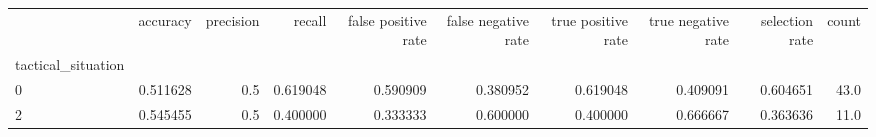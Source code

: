 \begin{tabular}{lrrrrrrrrr}
\toprule
{} &  accuracy &  precision &    recall &  false positive rate &  false negative rate &  true positive rate &  true negative rate &  selection rate &  count \\
tactical\_situation &           &            &           &                      &                      &                     &                     &                 &        \\
\midrule
0                  &  0.511628 &        0.5 &  0.619048 &             0.590909 &             0.380952 &            0.619048 &            0.409091 &        0.604651 &   43.0 \\
2                  &  0.545455 &        0.5 &  0.400000 &             0.333333 &             0.600000 &            0.400000 &            0.666667 &        0.363636 &   11.0 \\
\bottomrule
\end{tabular}
